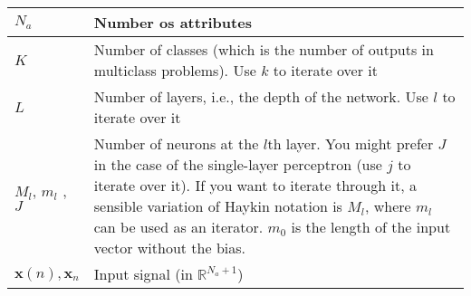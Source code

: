 \begin{xltabular}{\textwidth}{XX}
	\(N_a\)                                                                                                                                                                        & Number os attributes                                                                                                                                                                                                                                                                                                                   \\ \hline
	\(K\) \cite{haykinNeuralNetworksLearning2009}                                                                                                                                  & Number of classes (which is the number of outputs in multiclass problems). Use \(k\) to iterate over it                                                                                                                                                                                                                                \\ \hline
	\(L\)                                                                                                                                                                          & Number of layers, i.e., the depth of the network. Use \(l\) to iterate over it                                                                                                                                                                                                                                                         \\ \hline
	\(M_l\), \(m_l\) \cite{haykinNeuralNetworksLearning2009}, \(J\) \cite{haykinNeuralNetworksLearning2009}                                                                        & Number of neurons at the \(l\)th layer. You might prefer \(J\) in the case of the single-layer perceptron (use \(j\) to iterate over it). If you want to iterate through it, a sensible variation of Haykin notation is \(M_l\), where \(m_l\) can be used as an iterator. \(m_0\) is the length of the input vector without the bias. \\ \hline
	\(\mathbf{x}(n), \mathbf{x}_n\)                                                                                                                                                & Input signal (in \(\mathbb{R}^{N_a + 1}\))                                                                                                                                                                                                                                                                                             \\ \hline

\end{xltabular}
